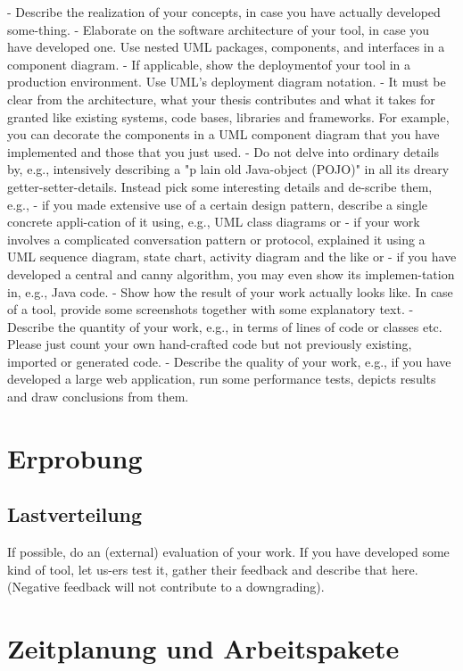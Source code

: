 - Describe the realization of your concepts, in case you have actually developed some-thing.
- Elaborate on the software architecture of your tool, in case you have developed one. Use nested UML packages, components, and interfaces in a component diagram.
- If applicable, show the deploymentof your tool in a production environment. Use UML's deployment diagram notation.
- It must be clear from the architecture, what your thesis contributes and what it takes for granted like existing systems, code bases, libraries and frameworks. For example, you can decorate the components in a UML component diagram that you have implemented and those that you just used.
- Do not delve into ordinary details by, e.g., intensively describing a "p lain old Java-object (POJO)" in all its dreary getter-setter-details. Instead pick some interesting details and de-scribe them, e.g.,
  - if   you made extensive use of a certain design pattern, describe a single concrete appli-cation of it using, e.g., UML class diagrams or
  - if your work involves a complicated conversation pattern or protocol, explained it using a UML sequence diagram, state chart, activity diagram and the like or
  - if you have developed a central and canny algorithm, you may even show its implemen-tation in, e.g., Java code.
- Show how the result of your work actually looks like. In case of a tool, provide some screenshots together with some explanatory text.
- Describe the quantity of your work, e.g., in terms of lines of code or classes etc. Please just count your own hand-crafted code but not previously existing, imported or generated code.
- Describe the quality of your work, e.g., if you have developed a large web application, run some performance tests, depicts results and draw conclusions from them.

\section{Erprobung}

\subsection{Lastverteilung}

If possible, do an (external) evaluation of your work. If you have developed some kind of tool, let us-ers test it, gather their feedback and describe that here. (Negative feedback will not contribute to a downgrading).

\section{Zeitplanung und Arbeitspakete}

